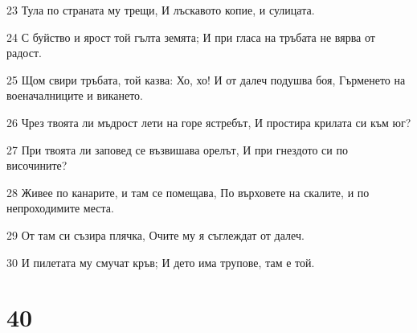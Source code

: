 \par 23 Тула по страната му трещи, И лъскавото копие, и сулицата.
\par 24 С буйство и ярост той гълта земята; И при гласа на тръбата не вярва от радост.
\par 25 Щом свири тръбата, той казва: Хо, хо! И от далеч подушва боя, Гърменето на военачалниците и викането.
\par 26 Чрез твоята ли мъдрост лети на горе ястребът, И простира крилата си към юг?
\par 27 При твоята ли заповед се възвишава орелът, И при гнездото си по височините?
\par 28 Живее по канарите, и там се помещава, По върховете на скалите, и по непроходимите места.
\par 29 От там си съзира плячка, Очите му я съглеждат от далеч.
\par 30 И пилетата му смучат кръв; И дето има трупове, там е той.

\chapter{40}

